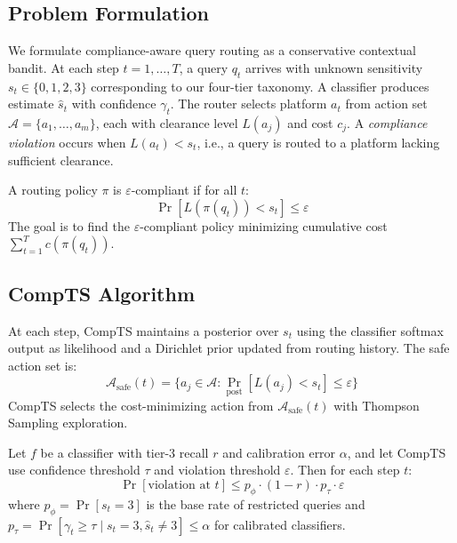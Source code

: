 

\subsection{Problem Formulation}

We formulate compliance-aware query routing as a conservative contextual 
bandit. At each step $t = 1, \ldots, T$, a query $q_t$ arrives with 
unknown sensitivity $s_t \in \{0, 1, 2, 3\}$ corresponding to our 
four-tier taxonomy. A classifier produces estimate $\hat{s}_t$ with 
confidence $\gamma_t$. The router selects platform $a_t$ from action 
set $\mathcal{A} = \{a_1, \ldots, a_m\}$, each with clearance level 
$L(a_j)$ and cost $c_j$. A \emph{compliance violation} occurs when 
$L(a_t) < s_t$, i.e., a query is routed to a platform lacking 
sufficient clearance.

\begin{definition}
A routing policy $\pi$ is $\varepsilon$-compliant if for all $t$:
\begin{equation}
\Pr[L(\pi(q_t)) < s_t] \leq \varepsilon
\end{equation}
The goal is to find the $\varepsilon$-compliant policy minimizing 
cumulative cost $\sum_{t=1}^{T} c(\pi(q_t))$.
\end{definition}

\subsection{CompTS Algorithm}

At each step, CompTS maintains a posterior over $s_t$ using the 
classifier softmax output as likelihood and a Dirichlet prior updated 
from routing history. The safe action set is:
\begin{equation}
\mathcal{A}_{\text{safe}}(t) = \{a_j \in \mathcal{A} : 
\Pr_{\text{post}}[L(a_j) < s_t] \leq \varepsilon\}
\end{equation}
CompTS selects the cost-minimizing action from $\mathcal{A}_{\text{safe}}(t)$ 
with Thompson Sampling exploration.


\begin{theorem}
\label{thm:safety}
Let $f$ be a classifier with tier-3 recall $r$ and calibration error 
$\alpha$, and let CompTS use confidence threshold $\tau$ and violation 
threshold $\varepsilon$. Then for each step $t$:
\begin{equation}
\Pr[\text{violation at } t] \leq p_{\phi} \cdot (1-r) \cdot p_\tau \cdot \varepsilon
\end{equation}
where $p_\phi = \Pr[s_t = 3]$ is the base rate of restricted queries 
and $p_\tau = \Pr[\gamma_t \geq \tau \mid s_t = 3, \hat{s}_t \neq 3] 
\leq \alpha$ for calibrated classifiers.
\end{theorem}

